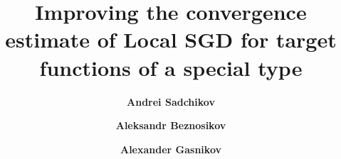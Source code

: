 
\title{\fontsize{12}{14}\selectfont \textbf{Improving the convergence estimate of Local SGD for target functions of a special type}}

\author[1]{\fontsize{11}{14} \textbf{Andrei Sadchikov}}
\author[1]{\fontsize{11}{14} \textbf{Aleksandr Beznosikov}}
\author[1]{\fontsize{11}{14} \textbf{Alexander Gasnikov}}

\date{}